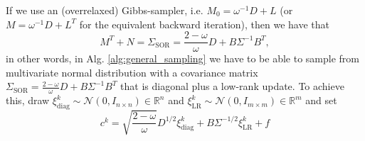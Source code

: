 \documentclass[11pt]{article}
\begin{document}
If we use an (overrelaxed) Gibbs-sampler, i.e. $M_0=\omega^{-1} D+L$ (or $M=\omega^{-1} D+L^T$ for the equivalent backward iteration), then we have that
\begin{equation}
    M^T+N = \Sigma_{\text{SOR}} = \frac{2-\omega}{\omega}D + B\Sigma^{-1}B^T,
\end{equation}
in other words, in Alg. \ref{alg:general_sampling} we have to be able to sample from multivariate normal distribution with a covariance matrix $\Sigma_{\text{SOR}}=\frac{2-\omega}{\omega}D + B\Sigma^{-1}B^T$ that is diagonal plus a low-rank update. To achieve this, draw $\xi^k_\text{diag}\sim\mathcal{N}(0,I_{n\times n})\in\mathbb{R}^n$ and $\xi^k_\text{LR}\sim\mathcal{N}(0,I_{m\times m})\in\mathbb{R}^m$ and set
\begin{equation}
    c^k = \sqrt{\frac{2-\omega}{\omega}}D^{1/2} \xi^k_{\text{diag}} + B\Sigma^{-1/2} \xi^k_{\text{LR}} + f
\end{equation}



\end{document}

